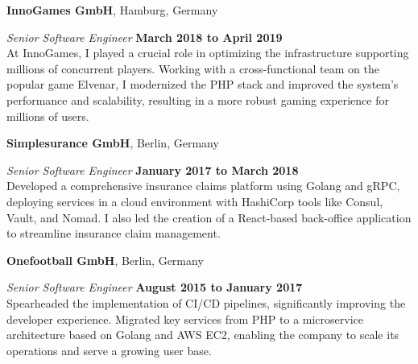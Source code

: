 \documentclass[12pt]{article}
\newcommand{\halfblankline}{\quad\vspace{-0.5\baselineskip}\pagebreak[3]}
\begin{document}
\halfblankline

\halfblankline

\textbf{InnoGames GmbH},
Hamburg, Germany
\begin{outerlist}

    \item[] \textit{Senior Software Engineer}%
            \hfill \textbf{March 2018 to April 2019}\\
            At InnoGames, I played a crucial role in optimizing the infrastructure supporting millions of concurrent players. Working with a cross-functional team on the popular game Elvenar, I modernized the PHP stack and improved the system's performance and scalability, resulting in a more robust gaming experience for millions of users.
            
\end{outerlist}

\halfblankline

\textbf{Simplesurance GmbH},
Berlin, Germany
\begin{outerlist}

    \item[] \textit{Senior Software Engineer}%
            \hfill \textbf{January 2017 to March 2018}\\
            Developed a comprehensive insurance claims platform using Golang and gRPC, deploying services in a cloud environment with HashiCorp tools like Consul, Vault, and Nomad. I also led the creation of a React-based back-office application to streamline insurance claim management.
            
\end{outerlist}

\halfblankline

\textbf{Onefootball GmbH},
Berlin, Germany
\begin{outerlist}

    \item[] \textit{Senior Software Engineer}%
            \hfill \textbf{August 2015 to January 2017}\\
            Spearheaded the implementation of CI/CD pipelines, significantly improving the developer experience. Migrated key services from PHP to a microservice architecture based on Golang and AWS EC2, enabling the company to scale its operations and serve a growing user base.
            
\end{outerlist}

\halfblankline
\end{document}
